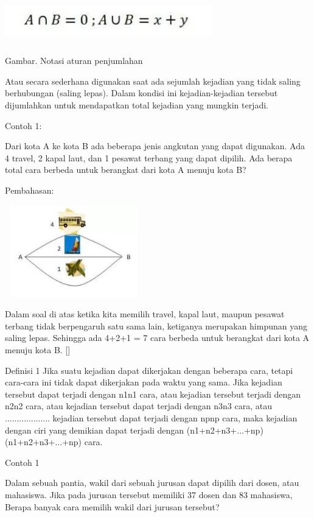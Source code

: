 \documentclass[11pt,fleqn]{book} %
\begin{document}
 \includegraphics[width = 9cm, height= 2cm]{Pictures/notasijumlah.JPG}
 
 
 Gambar. Notasi aturan penjumlahan
 
 Atau secara sederhana digunakan saat ada sejumlah kejadian yang tidak saling berhubungan (saling lepas). Dalam kondisi ini kejadian-kejadian tersebut dijumlahkan untuk mendapatkan total kejadian yang mungkin terjadi.

Contoh 1:

Dari kota A ke kota B ada beberapa jenis angkutan yang dapat digunakan. Ada 4 travel, 2 kapal laut, dan 1 pesawat terbang yang dapat dipilih. Ada berapa total cara berbeda untuk berangkat dari kota A menuju kota B?

Pembahasan:


\includegraphics[width = 6cm, height= 4cm]{Pictures/contoh1.JPG}

	Dalam soal di atas ketika kita memilih travel, kapal laut, maupun pesawat terbang tidak berpengaruh satu sama lain, ketiganya merupakan himpunan yang saling lepas. Sehingga ada 4+2+1 = 7 cara berbeda untuk berangkat dari kota A menuju kota B. []

Definisi 1
Jika suatu kejadian dapat dikerjakan dengan beberapa cara, tetapi cara-cara ini tidak dapat dikerjakan pada waktu yang sama.
Jika kejadian tersebut dapat terjadi dengan n1n1 cara, atau
kejadian tersebut terjadi dengan n2n2 cara, atau
kejadian tersebut dapat terjadi dengan n3n3 cara, atau
...................
kejadian tersebut dapat terjadi dengan npnp cara,
maka kejadian dengan ciri yang demikian dapat terjadi dengan 
(n1+n2+n3+...+np)(n1+n2+n3+...+np) cara.

Contoh 1

Dalam sebuah pantia, wakil dari sebuah jurusan dapat dipilih dari dosen, atau mahasiswa. Jika pada jurusan tersebut memiliki 37 dosen dan 83 mahasiswa, Berapa banyak cara memilih wakil dari jurusan tersebut?
\end{document}
